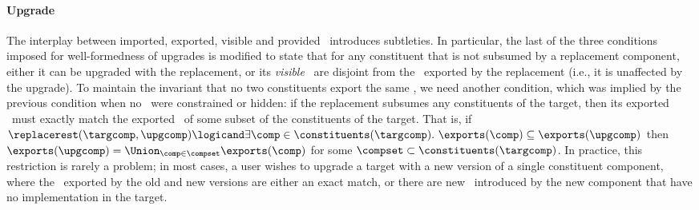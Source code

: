 \paragraph{Upgrade}
The interplay between imported, exported, visible and provided \apisN\
introduces subtleties.  In particular,
the last of the three conditions imposed for well-formedness of upgrades
is modified to state
that for any constituent that is not subsumed by a replacement component,
either it can be upgraded with the replacement,
or its \emph{visible} \apisN\ are disjoint
from the \apisN\ exported by the replacement
(i.e., it is unaffected by the upgrade).
To maintain the invariant that no two constituents export the same \apiN,
we need another condition,
which was implied by the previous condition
when no \apisN\ were constrained or hidden:
if the replacement subsumes any constituents of the target,
then its exported \apisN\ must exactly match
the exported \apisN\ of some subset of the constituents of the target.
That is,
if $\replacerest(\targcomp,\upgcomp)
        \logicand \exists \comp \in \constituents(\targcomp).\
                        \exports(\comp) \subseteq \exports(\upgcomp)$
then $\exports(\upgcomp) = \Union_{\comp \in \compset} \exports(\comp)$
for some $\compset \subset \constituents(\targcomp)$.
In practice, this restriction is rarely a problem;
in most cases, a user wishes to upgrade a target
with a new version of a single constituent component,
where the \apisN\ exported by the old and new versions
are either an exact match,
or there are new \apisN\ introduced by the new component
that have no implementation in the target.
